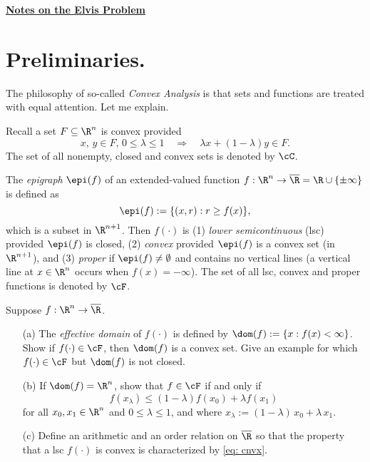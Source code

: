 \documentclass[12pt]{article}
\begin{document}
\begin{center}
{\LARGE\bf\underline{Notes on the Elvis Problem}}
\end{center}

\section{Preliminaries.}
The philosophy of so-called {\em Convex Analysis} is that sets and functions are treated with equal attention.   Let me explain.
  
Recall a set $F\subseteq\R^n$ is convex provided
\begin{equation}\label{eq: dir}
x,\,y\in F,\,0\leq\lambda \leq 1\quad\Longrightarrow\quad \lambda x+(1-\lambda)y\in F.
\end{equation}
The set of all nonempty, closed and convex sets is denoted by $\cC$.  

The {\em epigraph} $\epi(f)$ of an extended-valued function $f:\R^n\to\overline{\R}=\R\cup\{\pm\infty\}$ is defined as 
\[
\epi(f):=\{(x,r):r\geq f(x)\},
\]
which is a subset in $\R^{n+1}$.  Then $f(\cdot)$ is (1) {\em lower semicontinuous} (lsc) provided $\epi(f)$ is closed, (2) {\it convex} provided $\epi(f)$ is a convex set (in $\R^{n+1}$), and (3) {\it proper} if $\epi(f)\not=\emptyset$ and contains no vertical lines (a vertical line at $x\in\R^n$ occurs when $f(x)=-\infty$).  The set of all lsc, convex and proper functions is denoted by $\cF$.   


{\blue
\begin{exer}
Suppose $f:\R^n\to\overline{\R}$.
\begin{itemize}
\item[(a)]  The {\em effective domain} of $f(\cdot)$ is defined by $\dom(f):=\{x:f(x)<\infty\}$.  Show if $f(\cdot)\in\cF$, then $\dom(f)$ is a convex set.  Give an example for which $f(\cdot)\in\cF$ but $\dom(f)$ is not closed.
\item[(b)]  If $\dom(f)=\R^n$, show that $f\in\cF$ if and only if 
\begin{equation}\label{eq: cnvx}
f(x_{\lambda})\leq (1-\lambda)f(x_0)+\lambda f(x_1)
\end{equation}
for all $x_0,x_1\in\R^n$ and $0\leq \lambda\leq 1$, and where $x_{\lambda}:=(1-\lambda)\,x_0+\lambda\,x_1$.
\item[(c)]  Define an arithmetic and an order relation on $\overline{\R}$ so that the property that a lsc $f(\cdot)$ is convex is characterized by \eqref{eq: cnvx}.
\end{itemize}
\end{exer}
}
\end{document}
